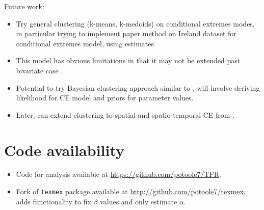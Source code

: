 \documentclass{article}
\numberwithin{equation}{section}
\begin{document}
Future work:
\begin{itemize}
  \item Try general clustering (k-means, k-medoids) on conditional extremes modes, in particular trying to implement \cite{Vignotto2021} paper method on Ireland dataset for conditional extremes model, using estimates 
  \item This model has obvious limitations in that it may not be extended past bivariate case .
  \item Potential to try Bayesian clustering approach similar to \cite{Rohrbeck2021}, will involve deriving likelihood for CE model and priors for parameter values. 
  \item Later, can extend clustering to spatial and spatio-temporal CE from \cite{Tawn2018}.
\end{itemize}

\section{Code availability}

\begin{itemize}
  \item Code for analysis available at \url{https://github.com/potoole7/TFR}. 
  \item Fork of \texttt{texmex} package available at \url{http://github.com/potoole7/texmex}, adds functionality to fix $\beta$ values and only estimate $\alpha$. 
\end{itemize}

\newpage

\end{document}
